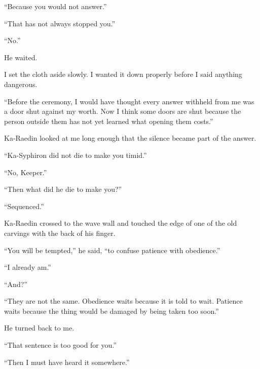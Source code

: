 ``Because you would not answer.''\par

``That has not always stopped you.''\par

``No.''\par

He waited.\par

I set the cloth aside slowly. I wanted it down properly before I said anything dangerous.\par

``Before the ceremony, I would have thought every answer withheld from me was a door shut against my worth. Now I think some doors are shut because the person outside them has not yet learned what opening them costs.''\par

Ka-Raedin looked at me long enough that the silence became part of the answer.\par

``Ka-Syphiron did not die to make you timid.''\par

``No, Keeper.''\par

``Then what did he die to make you?''\par

``Sequenced.''\par

Ka-Raedin crossed to the wave wall and touched the edge of one of the old carvings with the back of his finger.\par

``You will be tempted,'' he said, ``to confuse patience with obedience.''\par

``I already am.''\par

``And?''\par

``They are not the same. Obedience waits because it is told to wait. Patience waits because the thing would be damaged by being taken too soon.''\par

He turned back to me.\par

``That sentence is too good for you.''\par

``Then I must have heard it somewhere.''\par

